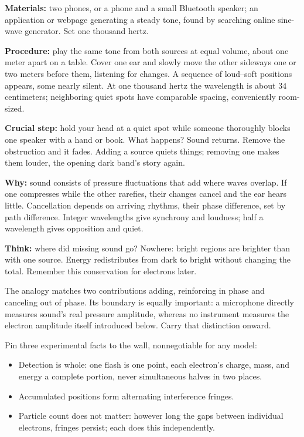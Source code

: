 \begin{experiment}
\textbf{Materials:} two phones, or a phone and a small Bluetooth speaker; an application or webpage generating a steady tone, found by searching online sine-wave generator. Set one thousand hertz.

\textbf{Procedure:} play the same tone from both sources at equal volume, about one meter apart on a table. Cover one ear and slowly move the other sideways one or two meters before them, listening for changes. A sequence of loud--soft positions appears, some nearly silent. At one thousand hertz the wavelength is about \(34\) centimeters; neighboring quiet spots have comparable spacing, conveniently room-sized.

\textbf{Crucial step:} hold your head at a quiet spot while someone thoroughly blocks one speaker with a hand or book. What happens? Sound returns. Remove the obstruction and it fades. Adding a source quiets things; removing one makes them louder, the opening dark band's story again.

\textbf{Why:} sound consists of pressure fluctuations that add where waves overlap. If one compresses while the other rarefies, their changes cancel and the ear hears little. Cancellation depends on arriving rhythms, their phase difference, set by path difference. Integer wavelengths give synchrony and loudness; half a wavelength gives opposition and quiet.

\textbf{Think:} where did missing sound go? Nowhere: bright regions are brighter than with one source. Energy redistributes from dark to bright without changing the total. Remember this conservation for electrons later.
\end{experiment}

The analogy matches two contributions adding, reinforcing in phase and canceling out of phase. Its boundary is equally important: a microphone directly measures sound's real pressure amplitude, whereas no instrument measures the electron amplitude itself introduced below. Carry that distinction onward.


Pin three experimental facts to the wall, nonnegotiable for any model:

\begin{itemize}[leftmargin=1.8em]
\item Detection is whole: one flash is one point, each electron's charge, mass, and energy a complete portion, never simultaneous halves in two places.
\item Accumulated positions form alternating interference fringes.
\item Particle count does not matter: however long the gaps between individual electrons, fringes persist; each does this independently.
\end{itemize}

